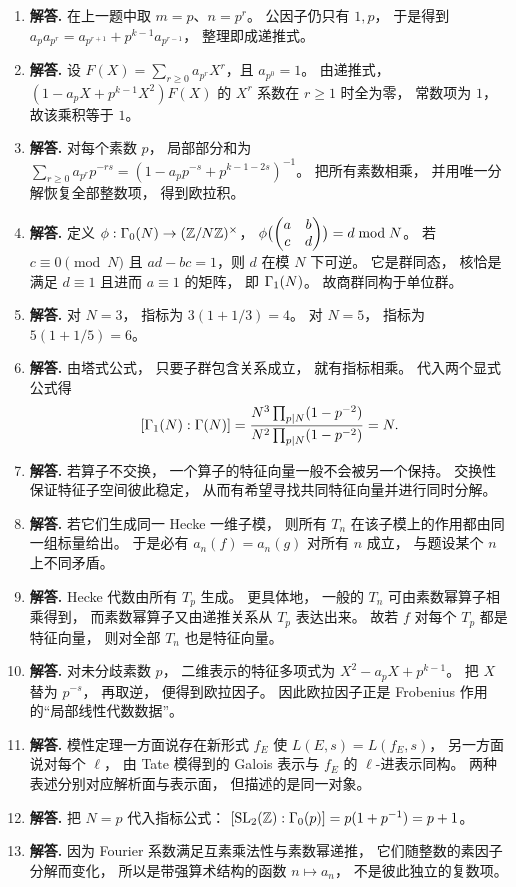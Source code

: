 \begin{enumerate}[label=\textbf{\arabic*.}, leftmargin=*, itemsep=1em]
\item \textbf{解答.} 在上一题中取 $m=p$、$n=p^r$。 公因子仍只有 $1,p$， 于是得到 $a_pa_{p^r}=a_{p^{r+1}}+p^{k-1}a_{p^{r-1}}$， 整理即成递推式。
\item \textbf{解答.} 设 $F(X)=\sum_{r\ge 0}a_{p^r}X^r$，且 $a_{p^0}=1$。 由递推式， $(1-a_pX+p^{k-1}X^2)F(X)$ 的 $X^r$ 系数在 $r\ge 1$ 时全为零， 常数项为 $1$， 故该乘积等于 $1$。
\item \textbf{解答.} 对每个素数 $p$， 局部部分和为 $\sum_{r\ge 0}a_{p^r}p^{-rs}=(1-a_pp^{-s}+p^{k-1-2s})^{-1}$。 把所有素数相乘， 并用唯一分解恢复全部整数项， 得到欧拉积。
\item \textbf{解答.} 定义 $\phi:\Gamma_0(N)\to (\mathbb{Z}/N\mathbb{Z})^\times$， $\phi\bigl(\begin{pmatrix} a&b\\c&d \end{pmatrix}\bigr)=d\bmod N$。 若 $c\equiv 0\pmod N$ 且 $ad-bc=1$，则 $d$ 在模 $N$ 下可逆。 它是群同态， 核恰是满足 $d\equiv 1$ 且进而 $a\equiv 1$ 的矩阵， 即 $\Gamma_1(N)$。 故商群同构于单位群。
\item \textbf{解答.} 对 $N=3$， 指标为 $3(1+1/3)=4$。 对 $N=5$， 指标为 $5(1+1/5)=6$。
\item \textbf{解答.} 由塔式公式，
只要子群包含关系成立，
就有指标相乘。
代入两个显式公式得
\[ [\Gamma_1(N):\Gamma(N)] =\frac{N^3\prod_{p\mid N}(1-p^{-2})}{N^2\prod_{p\mid N}(1-p^{-2})}=N. \]
\item \textbf{解答.} 若算子不交换， 一个算子的特征向量一般不会被另一个保持。 交换性保证特征子空间彼此稳定， 从而有希望寻找共同特征向量并进行同时分解。
\item \textbf{解答.} 若它们生成同一 Hecke 一维子模， 则所有 $T_n$ 在该子模上的作用都由同一组标量给出。 于是必有 $a_n(f)=a_n(g)$ 对所有 $n$ 成立， 与题设某个 $n$ 上不同矛盾。
\item \textbf{解答.} Hecke 代数由所有 $T_p$ 生成。 更具体地， 一般的 $T_n$ 可由素数幂算子相乘得到， 而素数幂算子又由递推关系从 $T_p$ 表达出来。 故若 $f$ 对每个 $T_p$ 都是特征向量， 则对全部 $T_n$ 也是特征向量。
\item \textbf{解答.} 对未分歧素数 $p$， 二维表示的特征多项式为 $X^2-a_pX+p^{k-1}$。 把 $X$ 替为 $p^{-s}$， 再取逆， 便得到欧拉因子。 因此欧拉因子正是 Frobenius 作用的“局部线性代数数据”。
\item \textbf{解答.} 模性定理一方面说存在新形式 $f_E$ 使 $L(E,s)=L(f_E,s)$， 另一方面说对每个 $\ell$， 由 Tate 模得到的 Galois 表示与 $f_E$ 的 $\ell$-进表示同构。 两种表述分别对应解析面与表示面， 但描述的是同一对象。
\item \textbf{解答.} 把 $N=p$ 代入指标公式： $[\mathrm{SL}_2(\mathbb{Z}):\Gamma_0(p)]=p(1+p^{-1})=p+1$。
\item \textbf{解答.} 因为 Fourier 系数满足互素乘法性与素数幂递推， 它们随整数的素因子分解而变化， 所以是带强算术结构的函数 $n\mapsto a_n$， 不是彼此独立的复数项。

\end{enumerate}
